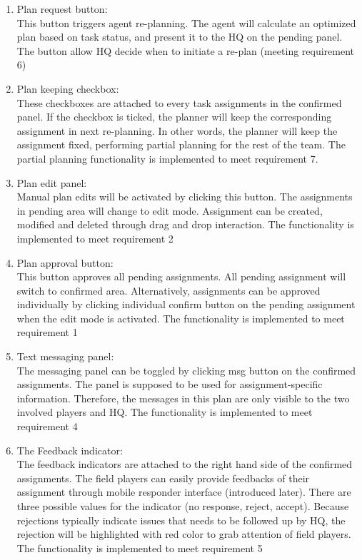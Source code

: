 \begin{enumerate}
\item Plan request button: \\
This button triggers agent re-planning. The agent will calculate an optimized plan based on task status, and present it to the HQ on the pending panel. The button allow HQ decide when to initiate a re-plan (meeting requirement 6)\\

\item Plan keeping checkbox:\\
These checkboxes are attached to every task assignments in the confirmed panel. If the checkbox is ticked, the planner will keep the corresponding assignment in next re-planning. In other words, the planner will keep the assignment fixed, performing partial planning for the rest of the team. The partial planning functionality is implemented to meet requirement 7.

\item Plan edit panel: \\
Manual plan edits will be activated by clicking this button. The assignments in pending area will change to edit mode. Assignment can be created, modified and deleted through drag and drop interaction. The functionality is implemented to meet requirement 2\\


\item Plan approval button: \\
This button approves all pending assignments. All pending assignment will switch to confirmed area. Alternatively, assignments can be approved individually by clicking individual confirm button on the pending assignment when the edit mode is activated. The functionality is implemented to meet requirement 1\\

\item Text messaging panel:\\
The messaging panel can be toggled by clicking msg button on the confirmed assignments. The panel is supposed to be used for assignment-specific information. Therefore, the messages in this plan are only visible to the two involved players and HQ. The functionality is implemented to meet requirement 4 \\

\item The Feedback indicator:\\
The feedback indicators are attached to the right hand side of the confirmed assignments. The field players can easily provide feedbacks of their assignment through mobile responder interface (introduced later). There are three possible values for the indicator (no response, reject, accept). Because rejections typically indicate issues that needs to be followed up by HQ, the rejection will be highlighted with red color to grab attention of field players.  The functionality is implemented to meet requirement 5\\


\end{enumerate}
